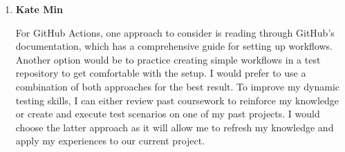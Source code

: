 \documentclass[12pt, titlepage]{article}
\begin{document}
\begin{enumerate}
\begin{enumerate}
      \item \textbf{Kate Min}

        For GitHub Actions, one approach to consider is reading through GitHub's
        documentation, which has a comprehensive guide for setting up workflows.
        Another option would be to practice creating simple workflows in a test
        repository to get comfortable with the setup. I would prefer to use a
        combination of both approaches for the best result. To improve my
        dynamic testing skills, I can either review past coursework to reinforce
        my knowledge or create and execute test scenarios on one of my past
        projects. I would choose the latter approach as it will allow me to
        refresh my knowledge and apply my experiences to our current project.
    \end{enumerate}
\end{enumerate}
\end{document}
